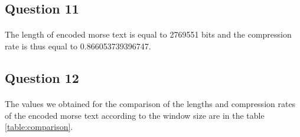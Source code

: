 \documentclass[a4paper, 11pt, oneside]{article}
\begin{document}
\subsection{Question 11}
\paragraph{}The length of encoded morse text is equal to 2769551 bits and the compression rate is thus equal to 0.866053739396747.

\subsection{Question 12}

\paragraph{}The values we obtained for the comparison of the lengths and compression rates of the encoded morse text according to the window size are in the table \ref{table:comparison}.
\end{document}
